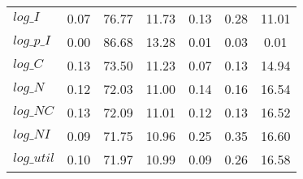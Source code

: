 \begin{center}
\begin{longtable}{lcccccc}
$log\_I     $	 & 	        0.07	 & 	       76.77	 & 	       11.73	 & 	        0.13	 & 	        0.28	 & 	       11.01 \\ 
$log\_p\_I  $	 & 	        0.00	 & 	       86.68	 & 	       13.28	 & 	        0.01	 & 	        0.03	 & 	        0.01 \\ 
$log\_C     $	 & 	        0.13	 & 	       73.50	 & 	       11.23	 & 	        0.07	 & 	        0.13	 & 	       14.94 \\ 
$log\_N     $	 & 	        0.12	 & 	       72.03	 & 	       11.00	 & 	        0.14	 & 	        0.16	 & 	       16.54 \\ 
$log\_NC    $	 & 	        0.13	 & 	       72.09	 & 	       11.01	 & 	        0.12	 & 	        0.13	 & 	       16.52 \\ 
$log\_NI    $	 & 	        0.09	 & 	       71.75	 & 	       10.96	 & 	        0.25	 & 	        0.35	 & 	       16.60 \\ 
$log\_util  $	 & 	        0.10	 & 	       71.97	 & 	       10.99	 & 	        0.09	 & 	        0.26	 & 	       16.58 \\ 
\end{longtable}
 \end{center}
